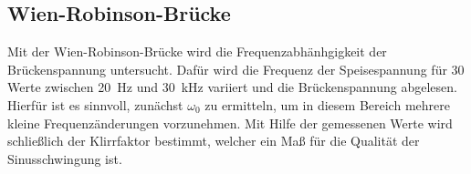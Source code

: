 \subsection{Wien-Robinson-Brücke}
Mit der Wien-Robinson-Brücke wird die Frequenzabhänhgigkeit der Brückenspannung untersucht.
Dafür wird die Frequenz der Speisespannung für 30 Werte zwischen \SI{20}{\Hz} und \SI{30}{\kilo\Hz}
variiert und die Brückenspannung abgelesen. Hierfür ist es sinnvoll, zunächst $\omega_0$ zu
ermitteln, um in diesem Bereich mehrere kleine Frequenzänderungen vorzunehmen.
Mit Hilfe der gemessenen Werte wird schließlich der Klirrfaktor bestimmt, welcher ein Maß für
die Qualität der Sinusschwingung ist.

\newpage
\nocite{*}
\printbibliography
